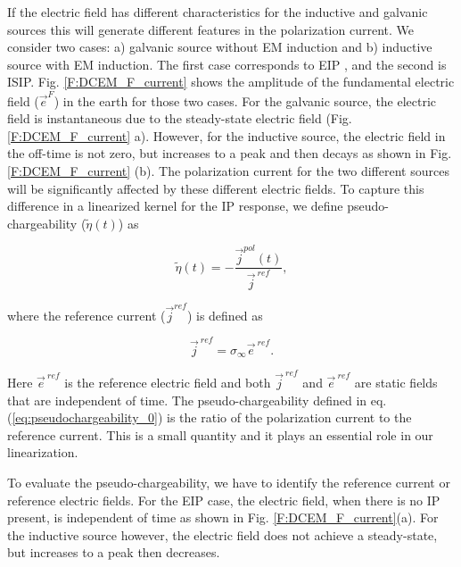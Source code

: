 \documentclass[extra,mreferee]{gji}
\newcommand{\siginf}{\sigma_\infty}
\renewcommand {\j}  { {\vec j} }
\newcommand {\e}  { {\vec e} }
\newcommand{\peta}{\tilde{\eta}}
\newcommand{\eref}{\e^{\ ref}}
\begin{document}
If the electric field has different characteristics for the inductive and galvanic sources this will generate different features in the polarization current.  
We consider two cases: a) galvanic source without EM induction and b) inductive source with EM induction. The first case corresponds to EIP \cite[]{seigel1959}, and the second is ISIP.
Fig. \ref{F:DCEM_F_current} shows the amplitude of the fundamental electric field ($\e^{F}$) in the earth for those two cases. 
For the galvanic source, the electric field is instantaneous due to the steady-state electric field (Fig. \ref{F:DCEM_F_current} a). 
However, for the inductive source, the electric field in the off-time is not zero, but increases to a peak and then decays as shown in Fig. \ref{F:DCEM_F_current} (b). 
The polarization current for the two different sources will be significantly affected by these different electric fields. 
To capture this difference in a linearized kernel for the IP response, we define pseudo-chargeability ($\peta(t)$) as 
\begin{linenomath*}
\begin{equation}
  \peta(t) = -\frac{\j^{pol}(t)}{\j^{\ ref}},
  \label{eq:pseudochargeability_0}
\end{equation}
\end{linenomath*}
where the reference current ($\j^{ref}$) is defined as 
\begin{linenomath*}
\begin{equation}
  \j^{\ ref} = \siginf \eref.
  \label{eq:reference_current}
\end{equation}
\end{linenomath*}
Here $\eref$ is the reference electric field and both $\j^{\ ref}$ and $\eref$ are static fields that are independent of time. 
The pseudo-chargeability defined in eq. (\ref{eq:pseudochargeability_0})  is the ratio of  the polarization current to the reference current. This is a small quantity and it plays an essential role in our linearization. 

To evaluate the pseudo-chargeability, we have to identify the reference current or reference electric fields. For the EIP case, the electric field, when there is no IP present, is independent of time as shown in Fig. \ref{F:DCEM_F_current}(a). For the inductive source however, the electric field does not achieve a steady-state, but increases to a  peak then decreases. 
\end{document}
